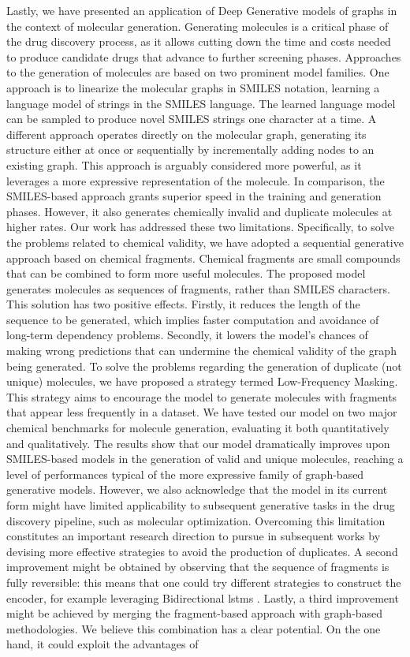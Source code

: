 Lastly, we have presented an application of Deep Generative models of graphs in the context of molecular generation. Generating molecules is a critical phase of the drug discovery process, as it allows cutting down the time and costs needed to produce candidate drugs that advance to further screening phases. Approaches to the generation of molecules are based on two prominent model families. One approach is to linearize the molecular graphs in SMILES notation, learning a language model of strings in the SMILES language. The learned language model can be sampled to produce novel SMILES strings one character at a time. A different approach operates directly on the molecular graph, generating its structure either at once or sequentially by incrementally adding nodes to an existing graph. This approach is arguably considered more powerful, as it leverages a more expressive representation of the molecule. In comparison, the SMILES-based approach grants superior speed in the training and generation phases. However, it also generates chemically invalid and duplicate molecules at higher rates. Our work has addressed these two limitations. Specifically, to solve the problems related to chemical validity, we have adopted a sequential generative approach based on chemical fragments. Chemical fragments are small compounds that can be combined to form more useful molecules. The proposed model generates molecules as sequences of fragments, rather than SMILES characters. This solution has two positive effects. Firstly, it reduces the length of the sequence to be generated, which implies faster computation and avoidance of long-term dependency problems. Secondly, it lowers the model's chances of making wrong predictions that can undermine the chemical validity of the graph being generated. To solve the problems regarding the generation of duplicate (\ie not unique) molecules, we have proposed a strategy termed Low-Frequency Masking. This strategy aims to encourage the model to generate molecules with fragments that appear less frequently in a dataset. We have tested our model on two major chemical benchmarks for molecule generation, evaluating it both quantitatively and qualitatively. The results show that our model dramatically improves upon SMILES-based models in the generation of valid and unique molecules, reaching a level of performances typical of the more expressive family of graph-based generative models. However, we also acknowledge that the model in its current form might have limited applicability to subsequent generative tasks in the drug discovery pipeline, such as molecular optimization. Overcoming this limitation constitutes an important research direction to pursue in subsequent works by devising more effective strategies to avoid the production of duplicates. A second improvement might be obtained by observing that the sequence of fragments is fully reversible: this means that one could try different strategies to construct the encoder, for example leveraging Bidirectional \glspl{lstm} \cite{schuster1997bidirectionallstm}. Lastly, a third improvement might be achieved by merging the fragment-based approach with graph-based methodologies. We believe this combination has a clear  potential. On the one hand, it could exploit the advantages of 